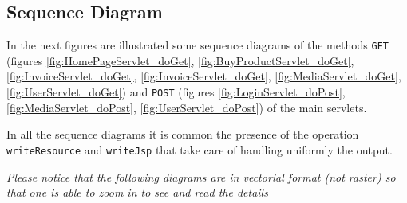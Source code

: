 \subsection{Sequence Diagram}

In the next figures are illustrated some sequence diagrams of the methods 
\texttt{GET} (figures  \ref{fig:HomePageServlet_doGet}, \ref{fig:BuyProductServlet_doGet},
\ref{fig:InvoiceServlet_doGet}, \ref{fig:InvoiceServlet_doGet}, \ref{fig:MediaServlet_doGet}, \ref{fig:UserServlet_doGet})
and  \texttt{POST}  (figures \ref{fig:LoginServlet_doPost}, \ref{fig:MediaServlet_doPost}, \ref{fig:UserServlet_doPost}) of the main servlets.

In all the sequence diagrams  it is common the presence
of the operation \texttt{writeResource} and \texttt{writeJsp} 
that take care of handling uniformly the output.

\textit{Please notice that the following diagrams are in vectorial format (not raster) so that one is able to zoom in to see and read the details}

